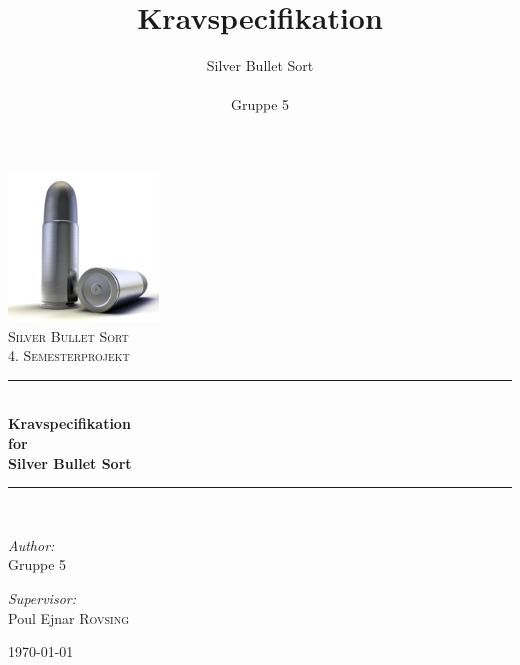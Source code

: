 \newcommand{\HRule}{\rule{\linewidth}{0.8mm}}
\author{Silver Bullet Sort\\\\Gruppe 5}
\title{Kravspecifikation}
\date{}

\begin{titlepage}

\begin{center}


\includegraphics[width=0.30\textwidth]{./Andre_afsnit/0_1_ForsideBillede.jpg}\\[1cm]    

\textsc{\LARGE Silver Bullet Sort}\\[1.5cm]

\textsc{\Large 4. Semesterprojekt}\\[0.5cm]


\HRule \\[0.4cm]

{ \huge \bfseries Kravspecifikation}\\[0.4cm]
{ \huge \bfseries for}\\[0.4cm] 
{ \huge \bfseries Silver Bullet Sort}\\[0.4cm]

\HRule \\[1.5cm]

\begin{minipage}{0.4\textwidth}
\begin{flushleft} \large
\emph{Author:}\\
Gruppe \textsc{5}
\end{flushleft}
\end{minipage}
\begin{minipage}{0.4\textwidth}
\begin{flushright} \large
\emph{Supervisor:} \\
Poul Ejnar \textsc{Rovsing}
\end{flushright}
\end{minipage}

\vfill

{\large \today}

\end{center}

\end{titlepage}

\newpage


\newpage
\tableofcontents

